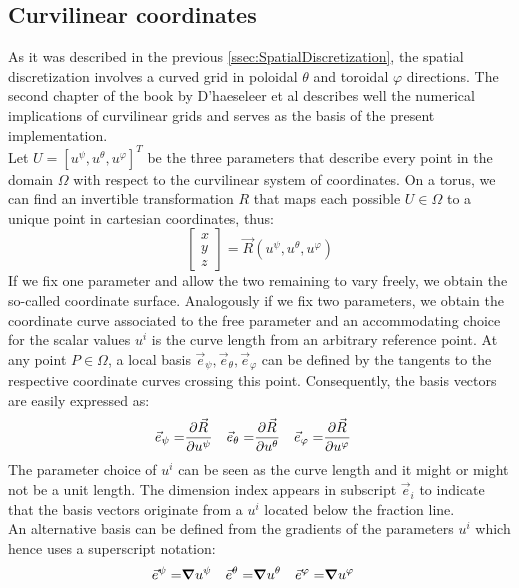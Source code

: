 \subsection{Curvilinear coordinates}
\label{ssec:MetricCurvilinearCoordinates}
As it was described in the previous \autoref{ssec:SpatialDiscretization}, the spatial discretization involves a curved grid in poloidal $\theta$ and toroidal $\varphi$ directions. The second chapter of the book by D’haeseleer et al \cite{CurvilinearGrids} describes well the numerical implications of curvilinear grids and serves as the basis of the present implementation. \\
Let $U=[u^\psi, u^\theta, u^\varphi]^T$ be the three parameters that describe every point in the domain $\Omega$ with respect to the curvilinear system of coordinates. On a torus, we can find an invertible transformation $R$ that maps each possible $U\in\Omega$ to a unique point in cartesian coordinates, thus: 
$$ \begin{bmatrix} x \\ y \\ z\end{bmatrix} = \vec{R}(u^\psi, u^\theta, u^\varphi) $$
If we fix one parameter and allow the two remaining to vary freely, we obtain the so-called coordinate surface. Analogously if we fix two parameters, we obtain the coordinate curve associated to the free parameter and an accommodating choice for the scalar values $u^i$ is the curve length from an arbitrary reference point. At any point $P\in\Omega$, a local basis ${\vec{e}_\psi, \vec{e}_\theta, \vec{e}_\varphi}$ can be defined by the tangents to the respective coordinate curves crossing this point. Consequently, the basis vectors are easily expressed as:
\begin{align*}
	\vec{e}_\psi =& \pdv{\vec{R}}{u^\psi} & \vec{e}_\theta =& \pdv{\vec{R}}{u^\theta} & \vec{e}_\varphi =& \pdv{\vec{R}}{u^\varphi}
\end{align*}
The parameter choice of $u^i$ can be seen as the curve length and it might or might not be a unit length. The dimension index appears in subscript $\vec{e}_i$ to indicate that the basis vectors originate from a $u^i$ located below the fraction line. \\
An alternative basis can be defined from the gradients of the parameters $u^i$ which hence uses a superscript notation:  
\begin{align*}
	\vec{e}^\psi = & \grad{u^\psi} & \vec{e}^\theta = & \grad{u^\theta} & \vec{e}^\varphi = & \grad{u^\varphi}
\end{align*}
